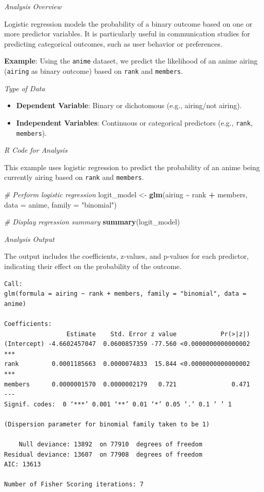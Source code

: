 \documentclass[
]{book}
\newenvironment{Shaded}{\begin{snugshade}}{\end{snugshade}}
\newcommand{\AttributeTok}[1]{\textcolor[rgb]{0.13,0.29,0.53}{#1}}
\newcommand{\CommentTok}[1]{\textcolor[rgb]{0.56,0.35,0.01}{\textit{#1}}}
\newcommand{\FunctionTok}[1]{\textcolor[rgb]{0.13,0.29,0.53}{\textbf{#1}}}
\newcommand{\NormalTok}[1]{#1}
\newcommand{\OtherTok}[1]{\textcolor[rgb]{0.56,0.35,0.01}{#1}}
\newcommand{\SpecialCharTok}[1]{\textcolor[rgb]{0.81,0.36,0.00}{\textbf{#1}}}
\newcommand{\StringTok}[1]{\textcolor[rgb]{0.31,0.60,0.02}{#1}}
\providecommand{\tightlist}{%
  \setlength{\itemsep}{0pt}\setlength{\parskip}{0pt}}
\begin{document}
\emph{Analysis Overview}

Logistic regression models the probability of a binary outcome based on one or more predictor variables. It is particularly useful in communication studies for predicting categorical outcomes, such as user behavior or preferences.

\textbf{Example}: Using the \texttt{anime} dataset, we predict the likelihood of an anime airing (\texttt{airing} as binary outcome) based on \texttt{rank} and \texttt{members}.

\emph{Type of Data}

\begin{itemize}
\tightlist
\item
  \textbf{Dependent Variable}: Binary or dichotomous (e.g., airing/not airing).
\item
  \textbf{Independent Variables}: Continuous or categorical predictors (e.g., \texttt{rank}, \texttt{members}).
\end{itemize}

\emph{R Code for Analysis}

This example uses logistic regression to predict the probability of an anime being currently airing based on \texttt{rank} and \texttt{members}.

\begin{Shaded}
\begin{Highlighting}[]
\CommentTok{\# Perform logistic regression}
\NormalTok{logit\_model }\OtherTok{\textless{}{-}} \FunctionTok{glm}\NormalTok{(airing }\SpecialCharTok{\textasciitilde{}}\NormalTok{ rank }\SpecialCharTok{+}\NormalTok{ members, }\AttributeTok{data =}\NormalTok{ anime, }\AttributeTok{family =} \StringTok{"binomial"}\NormalTok{)}

\CommentTok{\# Display regression summary}
\FunctionTok{summary}\NormalTok{(logit\_model)}
\end{Highlighting}
\end{Shaded}

\emph{Analysis Output}

The output includes the coefficients, z-values, and p-values for each predictor, indicating their effect on the probability of the outcome.

\begin{verbatim}
Call:
glm(formula = airing ~ rank + members, family = "binomial", data = anime)

Coefficients:
                 Estimate    Std. Error z value            Pr(>|z|)    
(Intercept) -4.6602457047  0.0600857359 -77.560 <0.0000000000000002 ***
rank         0.0001185663  0.0000074833  15.844 <0.0000000000000002 ***
members      0.0000001570  0.0000002179   0.721               0.471    
---
Signif. codes:  0 ‘***’ 0.001 ‘**’ 0.01 ‘*’ 0.05 ‘.’ 0.1 ‘ ’ 1

(Dispersion parameter for binomial family taken to be 1)

    Null deviance: 13892  on 77910  degrees of freedom
Residual deviance: 13607  on 77908  degrees of freedom
AIC: 13613

Number of Fisher Scoring iterations: 7
\end{verbatim}
\end{document}
